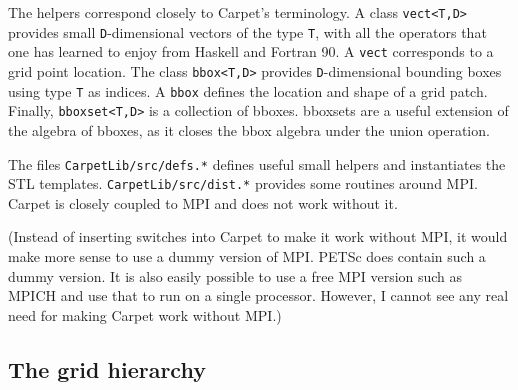 \documentclass{article}
\begin{document}
   The helpers correspond closely to Carpet's terminology.  A class
   \texttt{vect<T,D>} provides small \texttt{D}-dimensional vectors of
   the type \texttt{T}, with all the operators that one has learned to
   enjoy from Haskell and Fortran 90.  A \texttt{vect} corresponds to
   a grid point location.  The class \texttt{bbox<T,D>} provides
   \texttt{D}-dimensional bounding boxes using type \texttt{T} as
   indices.  A \texttt{bbox} defines the location and shape of a grid
   patch.  Finally, \texttt{bboxset<T,D>} is a collection of bboxes.
   bboxsets are a useful extension of the algebra of bboxes, as it
   closes the bbox algebra under the union operation.

   The files \texttt{CarpetLib/src/defs.*} defines useful small
   helpers and instantiates the STL templates.
   \texttt{CarpetLib/src/dist.*} provides some routines around MPI.
   Carpet is closely coupled to MPI and does not work without it.

   (Instead of inserting switches into Carpet to make it work without
   MPI, it would make more sense to use a dummy version of MPI.  PETSc
   does contain such a dummy version.  It is also easily possible to
   use a free MPI version such as MPICH and use that to run on a
   single processor.  However, I cannot see any real need for making
   Carpet work without MPI.)



\subsection{The grid hierarchy}
\end{document}
